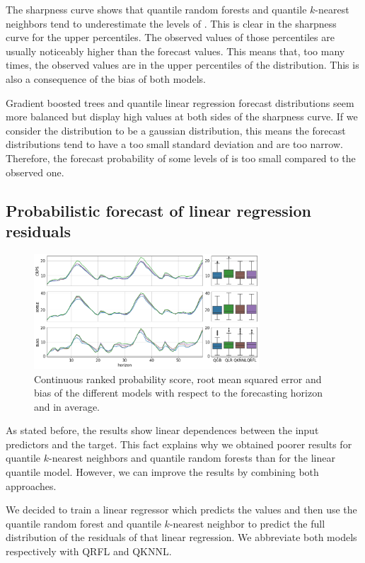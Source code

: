 \documentclass[a4paper,3p,sort&compress]{elsarticle}
\begin{document}
The sharpness curve shows that quantile random forests 
and quantile $k$-nearest
neighbors tend to underestimate the levels of
\no. This is clear in the sharpness curve for the
upper percentiles. The observed values of those percentiles are
usually noticeably higher than the forecast values. This means that,
too many times, the observed values are in the upper percentiles of
the distribution. This is also a consequence of the bias of both
models.

Gradient boosted trees and quantile linear regression forecast
distributions seem more balanced but display high values at both sides
of the sharpness curve.  If we consider the distribution to be a
gaussian distribution, this means the forecast distributions tend to
have a too small standard deviation and are too narrow. Therefore, the
forecast probability of some levels of \no is too
small compared to the observed one.

\subsection{Probabilistic forecast of linear regression residuals}

\begin{figure}[tbp]
  \centering
  \includegraphics[width=0.75\textwidth]{errorGraph_rfl_knnl}
  \caption{Continuous ranked probability score, root mean squared
    error and bias of the different models with respect to the
    forecasting horizon and in average.}
  \label{figure:errorGraph_rfl}
\end{figure}

As stated before, the results show linear dependences between the
input predictors and the target. This fact explains why we obtained
poorer results for quantile $k$-nearest neighbors and quantile random
forests than for the linear quantile model. However, we can improve
the results by combining both approaches.

We decided to train a linear regressor which predicts the
\no values and then use the quantile random forest and quantile
$k$-nearest neighbor to predict the full distribution of the residuals
of that linear regression. We abbreviate both models respectively with
QRFL and QKNNL.
\end{document}
